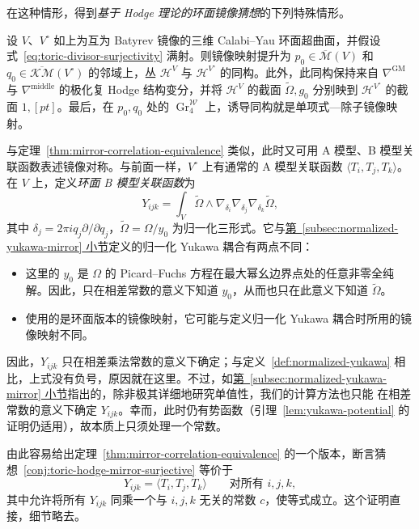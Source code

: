 在这种情形，得到\emph{基于 Hodge 理论的环面镜像猜想}的下列特殊情形。
\begin{conjecture}\label{conj:toric-hodge-mirror-surjective}
设 $V$、$V^\circ$ 如上为互为 Batyrev 镜像的三维 Calabi--Yau 环面超曲面，并假设式~\eqref{eq:toric-divisor-surjectivity} 满射。则镜像映射提升为 $p_0\in\overline{\mathcal M}(V)$ 和 $q_0\in\overline{\mathcal{KM}}(V^\circ)$ 的邻域上，丛 $\mathcal H^V$ 与 $\mathcal H^{V^\circ}$ 的同构。此外，此同构保持来自 $\nabla^{\mathrm{GM}}$ 与 $\nabla^{\mathrm{middle}}$ 的极化复 Hodge 结构变分，并将 $\mathcal H^V$ 的截面 $\widetilde\Omega,g_0$ 分别映到 $\mathcal H^{V^\circ}$ 的截面 $1,[pt]$。最后，在 $p_0,q_0$ 处的 $\operatorname{Gr}^{\mathcal W}_4$ 上，诱导同构就是单项式—除子镜像映射。
\end{conjecture}
与定理~\ref{thm:mirror-correlation-equivalence} 类似，此时又可用 A 模型、B 模型关联函数表述镜像对称。与前面一样，$V^\circ$ 上有通常的 A 模型关联函数 $\langle T_i,T_j,T_k\rangle$。在 $V$ 上，定义\emph{环面 B 模型关联函数}为
\[
Y_{ijk}=\int_V\widetilde\Omega\wedge\nabla_{\delta_i}\nabla_{\delta_j}\nabla_{\delta_k}\widetilde\Omega,
\]
其中 $\delta_j=2\pi iq_j\partial/\partial q_j$，$\widetilde\Omega=\Omega/y_0$ 为归一化三形式。它与\hyperref[subsec:normalized-yukawa-mirror]{第~\ref*{subsec:normalized-yukawa-mirror} 小节}定义的归一化 Yukawa 耦合有两点不同：
\begin{itemize}
\item 这里的 $y_0$ 是 $\Omega$ 的 Picard--Fuchs 方程在最大幂幺边界点处的任意非零全纯解。因此，只在相差常数的意义下知道 $y_0$，从而也只在此意义下知道 $\widetilde\Omega$。
\item 使用的是环面版本的镜像映射，它可能与定义归一化 Yukawa 耦合时所用的镜像映射不同。
\end{itemize}
因此，$Y_{ijk}$ 只在相差乘法常数的意义下确定；与定义~\ref{def:normalized-yukawa} 相比，上式没有负号，原因就在这里。不过，如\hyperref[subsec:normalized-yukawa-mirror]{第~\ref*{subsec:normalized-yukawa-mirror} 小节}指出的，除非极其详细地研究单值性，我们的计算方法也只能
在相差常数的意义下确定 $Y_{ijk}$。幸而，此时仍有势函数（引理~\ref{lem:yukawa-potential} 的证明仍适用），故本质上只须处理一个常数。

由此容易给出定理~\ref{thm:mirror-correlation-equivalence} 的一个版本，断言猜想~\ref{conj:toric-hodge-mirror-surjective} 等价于
\begin{equation}\label{eq:toric-mirror-correlations}
Y_{ijk}=\langle T_i,T_j,T_k\rangle\qquad\text{对所有 }i,j,k,
\end{equation}
其中允许将所有 $Y_{ijk}$ 同乘一个与 $i,j,k$ 无关的常数 $c$，使等式成立。这个证明直接，细节略去。

